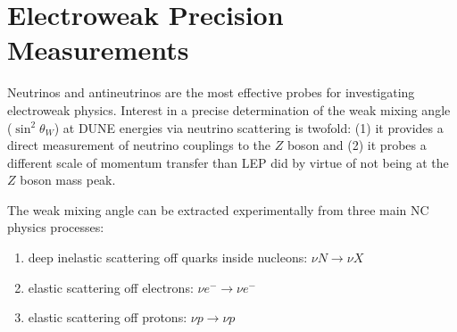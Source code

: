 \clearpage
\section{Electroweak Precision Measurements} 
\label{sec-ew-wma}

  Neutrinos and antineutrinos are the most effective probes for
  investigating electroweak physics.  Interest in a precise
  determination of the weak mixing angle ($\sin^2 \theta_W$) at DUNE
  energies via neutrino scattering is twofold: (1) it provides a
  direct measurement of neutrino couplings to the $Z$ boson and (2) it
  probes a different scale of momentum transfer than LEP 
did by virtue of not being at the $Z$ boson mass peak. 

The weak mixing angle can be extracted
experimentally from three main NC physics processes:
\begin{enumerate}%
\item deep inelastic scattering off quarks inside nucleons: $\nu N \to \nu X$
\item elastic scattering off electrons: $\nu e^- \to \nu e^-$
\item elastic scattering off protons: $\nu p \to \nu p$
\end{enumerate}

%
%  

